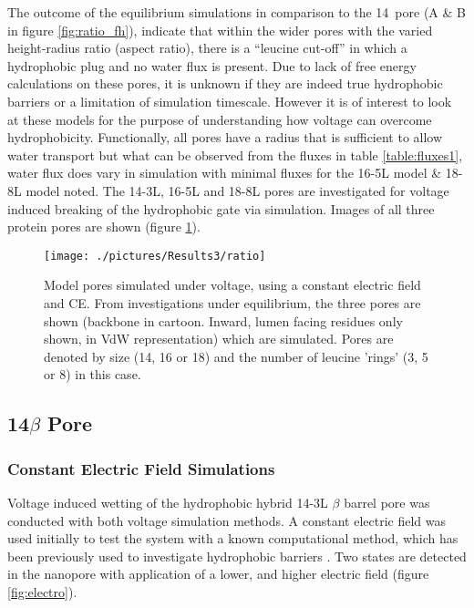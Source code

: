The outcome of the equilibrium simulations in comparison to the 14\bee\ pore (A \& B in figure \ref{fig:ratio_fh}), indicate that within the wider pores with the varied height-radius ratio (aspect ratio), there is a ``leucine cut-off'' in which a hydrophobic plug and no water flux is present. Due to lack of free energy calculations on these pores, it is unknown if they are indeed true hydrophobic barriers or a limitation of simulation timescale. However it is of interest to look at these models for the purpose of understanding how voltage can overcome hydrophobicity. Functionally, all pores have a radius that is sufficient to allow water transport but what can be observed from the fluxes in table \ref{table:fluxes1}, water flux does vary in simulation with minimal fluxes for the 16-5L model \& 18-8L model noted.  The 14-3L, 16-5L and 18-8L pores are investigated for voltage induced breaking of the hydrophobic gate via simulation. Images of all three protein pores are shown (figure \ref{fig:ratio}). 

\begin{figure}[H]
\begin{center}
\texttt{[image: ./pictures/Results3/ratio]}
\caption[Model pores simulated under voltage.] {Model pores simulated under voltage, using a constant electric field and CE. From investigations under equilibrium, the three pores are shown (backbone in cartoon. Inward, lumen facing residues only shown, in VdW representation) which are simulated. Pores are denoted by size (14, 16 or 18) and the number of leucine 'rings' (3, 5 or 8) in this case.}
\label{fig:ratio}
\end{center}
\end{figure}

\subsection{14$\beta$ Pore}

\subsubsection*{Constant Electric Field Simulations}

Voltage induced wetting of the hydrophobic hybrid 14-3L $\beta$ barrel pore was conducted with both voltage simulation methods. A constant electric field was used initially to test the system with a known computational method, which has been previously used to investigate hydrophobic barriers \cite{Dzubiella2005,Bratko2007,Vanzo2015x,Winarto2015}. Two states are detected in the nanopore with application of a lower, and higher electric field (figure \ref{fig:electro}).

